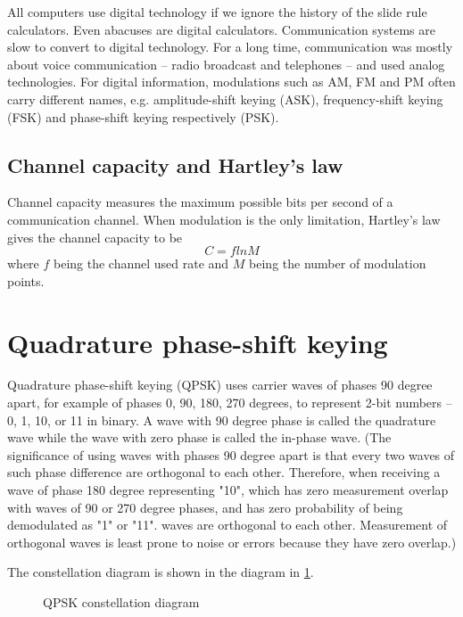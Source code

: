 \documentclass{book}
\begin{document}
All computers use digital technology if we ignore the history of the slide rule calculators. Even abacuses are digital calculators. Communication systems are slow to convert to digital technology. For a long time, communication was mostly about voice communication -- radio broadcast and telephones -- and used analog technologies. For digital information, modulations such as AM, FM and PM often carry different names, e.g. amplitude-shift keying (ASK), frequency-shift keying (FSK) and phase-shift keying respectively (PSK).

\subsection{Channel capacity and Hartley's law}
Channel capacity measures the maximum possible bits per second of a communication channel. When modulation is the only limitation, Hartley's law gives the channel capacity to be
\begin{equation}
    C = f ln M
\end{equation}
where $f$ being the channel used rate and $M$ being the number of modulation points.

\section{Quadrature phase-shift keying}
Quadrature phase-shift keying (QPSK) uses carrier waves of phases 90 degree apart, for example of phases 0, 90, 180, 270 degrees, to represent 2-bit numbers -- 0, 1, 10, or 11 in binary. A wave with 90 degree phase is called the quadrature wave while the wave with zero phase is called the in-phase wave.
(The significance of using waves with phases 90 degree apart is that every two waves of such phase difference are orthogonal to each other. Therefore, when receiving a wave of phase 180 degree representing "10", which has zero measurement overlap with waves of 90 or 270 degree phases, and has zero probability of being demodulated as "1" or "11".
waves are orthogonal to each other. Measurement of orthogonal waves is least prone to noise or errors 
because they have zero overlap.)

The constellation diagram is shown in the diagram in \ref{QPSK}.

\begin{figure}[ht]
\caption{QPSK constellation diagram}
\label{QPSK}
\end{figure}
\end{document}
